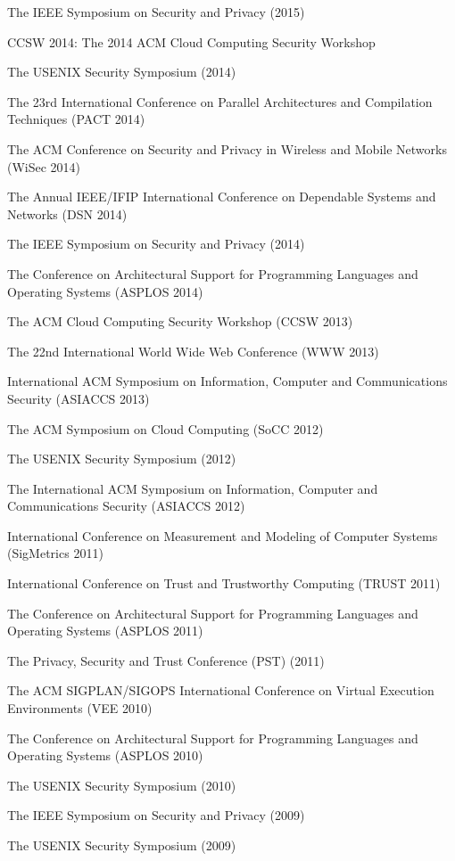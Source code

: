 \documentclass[10pt]{article}
\newenvironment{lonelist}[1][\enskip\textbullet]%
        {\vspace{-\baselineskip}\begin{list}{#1}{%
        \setlength{\partopsep}{0pt}%
        \setlength{\topsep}{0pt}
	\setlength{\leftmargin}{0pt}}}
        {\end{list}\vspace{-.6\baselineskip}}
\newenvironment{innerenum}[1][1.]%
        {\begin{compactenum}[#1]}{\end{compactenum}}
\begin{document}
\begin{lonelist}
\begin{innerenum}
\item The IEEE Symposium on Security and Privacy (2015)
\item CCSW 2014: The 2014 ACM Cloud Computing Security Workshop 
\item The USENIX Security Symposium (2014)
\item The 23rd International Conference on Parallel Architectures and Compilation Techniques (PACT 2014)
\item The ACM Conference on Security and Privacy in Wireless and Mobile Networks (WiSec 2014)
\item The Annual IEEE/IFIP International Conference on Dependable Systems and Networks (DSN 2014)
\item The IEEE Symposium on Security and Privacy (2014)
\item The Conference on Architectural Support for Programming Languages and Operating Systems (ASPLOS 2014)
\item The ACM Cloud Computing Security Workshop (CCSW 2013)
\item The 22nd International World Wide Web Conference (WWW 2013)
\item International ACM Symposium on Information, Computer and Communications Security (ASIACCS 2013) 
\item The ACM Symposium on Cloud Computing (SoCC 2012)
\item The USENIX Security Symposium (2012)
\item The International ACM Symposium on Information, Computer and Communications Security (ASIACCS 2012)
\item International Conference on Measurement and Modeling of Computer Systems (SigMetrics 2011)
\item International Conference on Trust and Trustworthy Computing (TRUST 2011)
\item The Conference on Architectural Support for Programming Languages and Operating Systems (ASPLOS 2011)
\item The Privacy, Security and Trust Conference (PST) (2011)
\item The ACM SIGPLAN/SIGOPS International Conference on Virtual Execution Environments (VEE 2010)
\item The Conference on Architectural Support for Programming Languages and Operating Systems (ASPLOS 2010)
\item The USENIX Security Symposium (2010)
\item The IEEE Symposium on Security and Privacy (2009)
\item The USENIX Security Symposium (2009)

\end{innerenum}
\end{lonelist}
\end{document}
